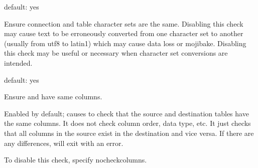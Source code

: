 \documentclass[letterpaper,10pt,english]{sphinxmanual}
\begin{document}

\begin{fulllineitems}
\label{\detokenize{mariadb-archiver:cmdoption-mariadb-archiver-1}}
default: yes

Ensure connection and table character sets are the same.  Disabling this check
may cause text to be erroneously converted from one character set to another
(usually from utf8 to latin1) which may cause data loss or mojibake.  Disabling
this check may be useful or necessary when character set conversions are
intended.

\end{fulllineitems}


\begin{fulllineitems}
\label{\detokenize{mariadb-archiver:cmdoption-mariadb-archiver-2}}
default: yes

Ensure {\hyperref[\detokenize{mariadb-archiver:cmdoption-mariadb-archiver-source}]{}} and {\hyperref[\detokenize{mariadb-archiver:cmdoption-mariadb-archiver-dest}]{}} have same columns.

Enabled by default; causes  to check that the source and destination
tables have the same columns.  It does not check column order, data type, etc.
It just checks that all columns in the source exist in the destination and
vice versa.  If there are any differences,  will exit with an
error.

To disable this check, specify \textendash{}no\sphinxhyphen{}check\sphinxhyphen{}columns.

\end{fulllineitems}
\end{document}
